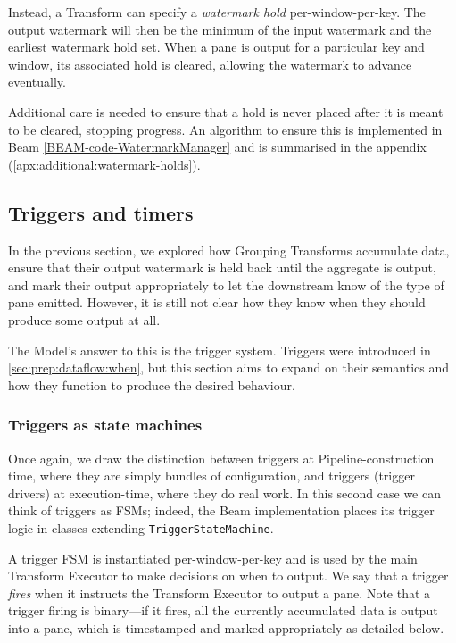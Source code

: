 Instead, a Transform can specify a \emph{watermark hold} per-window-per-key.
The output watermark will then be the minimum of the input watermark and the earliest watermark hold set.
When a pane is output for a particular key and window, its associated hold is cleared, allowing the watermark to advance eventually.

Additional care is needed to ensure that a hold is never placed after it is meant to be cleared, stopping progress.
An algorithm to ensure this is implemented in Beam \cref{BEAM-code-WatermarkManager} and is summarised in the appendix (\cref{apx:additional:watermark-holds}).

\subsection{Triggers and timers}\label{sec:impl:dataflow:triggers-timers}

In the previous section, we explored how Grouping Transforms accumulate data, ensure that their output watermark is held back until the aggregate is output, and mark their output appropriately to let the downstream know of the type of pane emitted.
However, it is still not clear how they know when they should produce some output at all.

The Model's answer to this is the trigger system.
Triggers were introduced in \cref{sec:prep:dataflow:when}, but this section aims to expand on their semantics and how they function to produce the desired behaviour.

\subsubsection{Triggers as state machines}
Once again, we draw the distinction between triggers at Pipeline-construction time, where they are simply bundles of configuration, and triggers (trigger drivers) at execution-time, where they do real work.
In this second case we can think of triggers as FSMs; indeed, the Beam implementation places its trigger logic in classes extending \verb|TriggerStateMachine|.

A trigger FSM is instantiated per-window-per-key and is used by the main Transform Executor to make decisions on when to output.
We say that a trigger \emph{fires} when it instructs the Transform Executor to output a pane.
Note that a trigger firing is binary---if it fires, all the currently accumulated data is output into a pane, which is timestamped and marked appropriately as detailed below.

